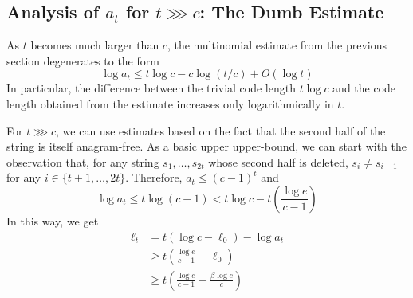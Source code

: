 \documentclass{patmorin}
\begin{document}
\subsection{Analysis of $a_t$ for $t\ggg c$: The Dumb Estimate}

As $t$ becomes much larger than $c$, the multinomial estimate from the previous section degenerates to the form
\[
   \log a_t \le t\log c - c\log(t/c) + O(\log t)
\]
In particular, the difference between the trivial code length $t\log c$ and the code length obtained from the estimate increases only logarithmically in $t$.

For $t\ggg c$, we can use estimates based on the fact that the second half of the string is itself anagram-free.  As a basic upper upper-bound, we can start with the observation that, for any string $s_1,\ldots,s_{2t}$ whose second half is deleted, $s_{i}\neq s_{i-1}$ for any $i\in\{t+1,\ldots,2t\}$.  Therefore,
$a_t \le (c-1)^t$ and
\[
     \log a_t \le t\log(c-1) < t\log c - t\left(\frac{\log e}{c-1}\right)
\]
In this way, we get
\begin{align*}
    \ell_t & = t(\log c - \ell_0) - \log a_t \\
        & \ge t\left(\frac{\log e}{c-1}-\ell_0\right) \\
        & \ge t\left(\frac{\log e}{c-1}-\frac{\beta\log c}{c}\right) 
\end{align*}
\end{document}
